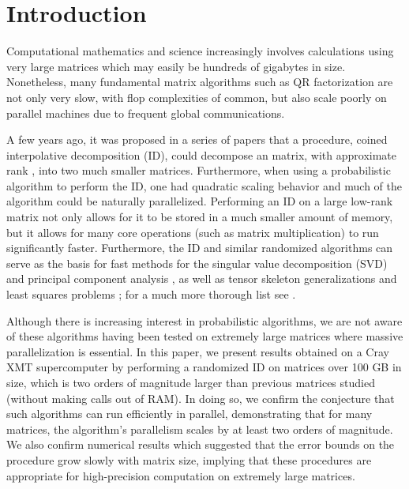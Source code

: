 \documentclass[11pt]{article}
\begin{document}
\pagestyle{fancy}
\renewcommand{\headrulewidth}{0pt}
\fancyhead{}

\fancyfoot{}
\fancyfoot[C] {\textsf{\textbf{\thepage}}}












\tableofcontents




\section{Introduction}
Computational mathematics and science increasingly involves calculations using very large matrices which may easily be hundreds of gigabytes in size.  Nonetheless, many fundamental matrix algorithms such as QR factorization are not only very slow, with flop complexities of  common, but also scale poorly on parallel machines due to frequent global communications.

A few years ago, it was proposed in a series of papers \cite{rokyale1, rokyale2, rokpnas} that a procedure, coined interpolative decomposition (ID), could decompose an  matrix, with approximate rank , into two much smaller matrices.  Furthermore, when using a probabilistic algorithm to perform the ID, one had quadratic scaling behavior and much of the algorithm could be naturally parallelized.   Performing an ID on a large low-rank matrix not only allows for it to be stored in a much smaller amount of memory, but it allows for many core operations (such as matrix multiplication) to run significantly faster.  Furthermore, the ID and similar randomized algorithms can serve as the basis for fast methods for the singular value decomposition (SVD) \cite{rokpnas} and principal component analysis \cite{rok1}, as well as tensor skeleton generalizations \cite{drineas} and least squares problems \cite{boutsidis, rok2, rudelson}; for a much more thorough list see \cite{martinsson}.

Although there is increasing interest in probabilistic algorithms, we are not aware of these algorithms having been tested on extremely large matrices where massive parallelization is essential.  In this paper, we present results obtained on a Cray XMT supercomputer by performing a randomized ID on matrices over 100 GB in size, which is two orders of magnitude larger than previous matrices studied (without making calls out of RAM).   In doing so, we confirm the conjecture that such algorithms can run efficiently in parallel, demonstrating that for many matrices, the algorithm's parallelism scales by at least two orders of magnitude.  We also confirm numerical results which suggested that the error bounds on the procedure grow slowly with matrix size, implying that these procedures are appropriate for high-precision computation on extremely large matrices.
\end{document}
